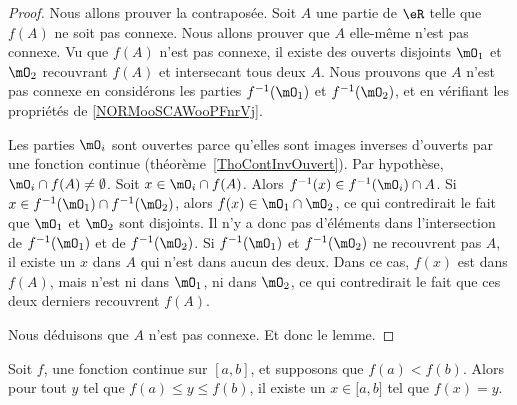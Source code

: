 \begin{proof}
    Nous allons prouver la contraposée. Soit \( A\) une partie de \( \eR\) telle que \( f(A)\) ne soit pas connexe. Nous allons prouver que \( A\) elle-même n'est pas connexe. Vu que \( f(A)\) n'est pas connexe, il existe des ouverts disjoints \( \mO_1\) et \( \mO_2\) recouvrant \( f(A)\) et intersecant tous deux \( A\). Nous prouvons que \( A\) n'est pas connexe en considérons les parties  \( f^{-1}(\mO_1)\) et \( f^{-1}(\mO_2)\), et en vérifiant les propriétés de \ref{NORMooSCAWooPFnrVj}.

    \begin{subproof}
        Les parties \( \mO_i\) sont ouvertes parce qu'elles sont images inverses d'ouverts par une fonction continue (théorème~\ref{ThoContInvOuvert}).
        Par hypothèse, \( \mO_i\cap f(A)\neq \emptyset\). Soit \( x\in\mO_i\cap f(A)\). Alors \( f^{-1}(x)\in f^{-1}(\mO_i)\cap A\).
		Si \( x\in f^{-1}(\mO_1)\cap f^{-1}(\mO_2)\), alors \( f(x)\in \mO_1\cap\mO_2\), ce qui contredirait le fait que \( \mO_1\) et \( \mO_2\) sont disjoints. Il n'y a donc pas d'éléments dans l'intersection de \( f^{-1}(\mO_1)\) et de \( f^{-1}(\mO_2)\).
		 Si \( f^{-1}(\mO_1)\) et \( f^{-1}(\mO_2)\) ne recouvrent pas \( A\), il existe un \( x\) dans \( A\) qui n'est dans aucun des deux. Dans ce cas, \( f(x)\) est dans \( f(A)\), mais n'est ni dans \( \mO_1\), ni dans \( \mO_2\), ce qui contredirait le fait que ces deux derniers recouvrent \( f(A)\).
    \end{subproof}
	Nous déduisons que \( A\) n'est pas connexe. Et donc le lemme.
\end{proof}

\begin{theorem}        \label{ThoValInter}
	Soit \( f\), une fonction continue sur \( [a,b]\), et supposons que \( f(a)<f(b)\). Alors pour tout \( y\) tel que \( f(a)\leq y\leq f(b)\), il existe un \( x\in\mathopen[ a , b \mathclose]\) tel que \( f(x)=y\).
\end{theorem}

